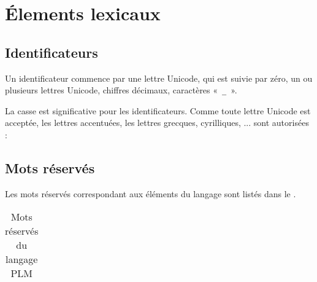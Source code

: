


\chapter{Élements lexicaux}

\thispagestyle{empty}





\section{Identificateurs}
Un identificateur commence par une lettre Unicode, qui est suivie par zéro, un ou plusieurs lettres Unicode, chiffres décimaux, caractères «~\texttt{\_}~».

La casse est significative pour les identificateurs. Comme toute lettre Unicode est acceptée, les lettres accentuées, les lettres grecques, cyrilliques, ... sont autorisées :





\section{Mots réservés}

%

Les mots réservés correspondant aux éléments du langage sont listés dans le .

\begin{table}[!t]
  \centering
  \begin{tabular}{llllll}
    
  \end{tabular}
  \caption{Mots réservés du langage PLM}
  \ligne
\end{table}







